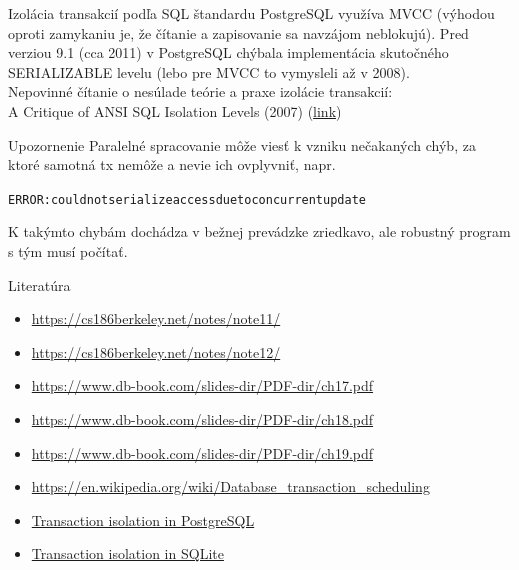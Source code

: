 \documentclass[12pt]{beamer}
\begin{document}
\begin{frame}[fragile]{Izolácia transakcií podľa SQL štandardu}
PostgreSQL využíva MVCC (výhodou oproti zamykaniu je, že čítanie a zapisovanie sa navzájom neblokujú).
Pred verziou 9.1 (cca 2011) v PostgreSQL chýbala implementácia skutočného SERIALIZABLE levelu
(lebo pre MVCC to vymysleli až v 2008).\\[5mm]

{\small
Nepovinné čítanie o nesúlade teórie a praxe izolácie transakcií:\\
A Critique of ANSI SQL Isolation Levels (2007) (\href{https://arxiv.org/abs/cs/0701157}{link})
}
\end{frame}

\begin{frame}[fragile]{Upozornenie}
Paralelné spracovanie môže viesť k vzniku \alert{nečakaných chýb}, za ktoré samotná tx nemôže a nevie ich ovplyvniť, napr.
{\scriptsize
\begin{alltt}
    ERROR:  could not serialize access due to concurrent update
\end{alltt}
}
K takýmto chybám dochádza v bežnej prevádzke zriedkavo, ale robustný program s tým musí počítať.
\end{frame}


\begin{frame}{Literatúra}
\begin{itemize}
\item {\scriptsize\url{https://cs186berkeley.net/notes/note11/}}
\item {\scriptsize\url{https://cs186berkeley.net/notes/note12/}}
\item {\scriptsize\url{https://www.db-book.com/slides-dir/PDF-dir/ch17.pdf}}
\item {\scriptsize\url{https://www.db-book.com/slides-dir/PDF-dir/ch18.pdf}}
\item {\scriptsize\url{https://www.db-book.com/slides-dir/PDF-dir/ch19.pdf}}
\item {\scriptsize\url{https://en.wikipedia.org/wiki/Database_transaction_scheduling}}
\item {\scriptsize\href{https://www.postgresql.org/docs/current/mvcc.html}{Transaction isolation in PostgreSQL}}
\item {\scriptsize\href{https://www.sqlite.org/isolation.html}{Transaction isolation in SQLite}}
\end{itemize}
\end{frame}
\end{document}
